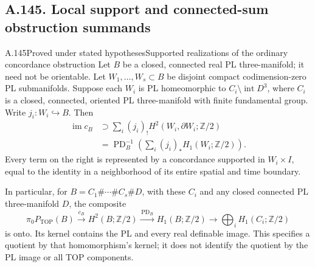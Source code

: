 \subsection{A.145. Local support and connected-sum obstruction summands}

\begin{saresult}{A.145}{Proved under stated hypotheses}{Supported realizations of the ordinary concordance obstruction}
Let $B$ be a closed, connected real PL three-manifold; it need not be
orientable. Let $W_1,\ldots,W_s\subset B$ be disjoint compact
codimension-zero PL submanifolds. Suppose each $W_i$ is PL homeomorphic
to $C_i\setminus\operatorname{int}D^3$, where $C_i$ is a closed,
connected, oriented PL three-manifold with finite fundamental group.
Write $j_i:W_i\hookrightarrow B$. Then
\[
 \begin{aligned}
 \operatorname{im}c_B
   &\supset\sum_i(j_i)_!H^2(W_i,\partial W_i;\mathbb Z/2)\\
   &=\operatorname{PD}_B^{-1}
        \left(\sum_i(j_i)_*H_1(W_i;\mathbb Z/2)\right).
 \end{aligned}
 \tag{145.1}
\]
Every term on the right is represented by a concordance supported in
$W_i\times I$, equal to the identity in a neighborhood of its entire
spatial and time boundary.

In particular, for
$B=C_1\#\cdots\#C_s\#D$, with these $C_i$ and any closed connected
PL three-manifold $D$, the composite
\[
 \pi_0P_{\mathrm{TOP}}(B)\xrightarrow{\,c_B\,}H^2(B;\mathbb Z/2)
 \xrightarrow{\,\operatorname{PD}_B\,}H_1(B;\mathbb Z/2)
 \longrightarrow\bigoplus_i H_1(C_i;\mathbb Z/2)
 \tag{145.2}
\]
is onto. Its kernel contains the PL and every real definable image.
This specifies a quotient by that homomorphism's kernel; it does
not identify the quotient by the PL image or all TOP components.
\end{saresult}

